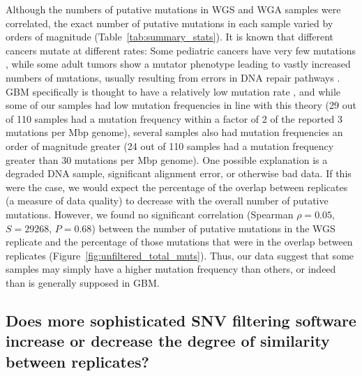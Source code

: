 \documentclass[11 pt]{article} %
\begin{document}
Although the numbers of putative mutations in WGS and WGA samples were correlated, the exact number of putative mutations in each sample varied by orders of magnitude (Table~\ref{tab:summary_stats}). It is known that different cancers mutate at different rates: Some pediatric cancers have very few mutations \citep{RB2hit, pediatric}, while some adult tumors show a mutator phenotype leading to vastly increased numbers of mutations, usually resulting from errors in DNA repair pathways \citep{mutator}. GBM specifically is thought to have a relatively low mutation rate \citep{Parsons, TCGA-GBM-13}, and while some of our samples had low mutation frequencies in line with this theory (29 out of 110 samples had a mutation frequency within a factor of 2 of the reported 3 mutations per Mbp genome), several samples also had mutation frequencies an order of magnitude greater (24 out of 110 samples had a mutation frequency greater than 30 mutations per Mbp genome). One possible explanation is a degraded DNA sample, significant alignment error, or otherwise bad data. If this were the case, we would expect the percentage of the overlap between replicates (a measure of data quality) to decrease with the overall number of putative mutations. However, we found no significant correlation (Spearman $\rho=0.05$, $S=29268$, $P=0.68$) between the number of putative mutations in the WGS replicate and the percentage of those mutations that were in the overlap between replicates (Figure~\ref{fig:unfiltered_total_muts}). Thus, our data suggest that some samples may simply have a higher mutation frequency than others, or indeed than is generally supposed in GBM.

\subsection*{Does more sophisticated SNV filtering software increase or decrease the degree of similarity between replicates?}
\end{document}
